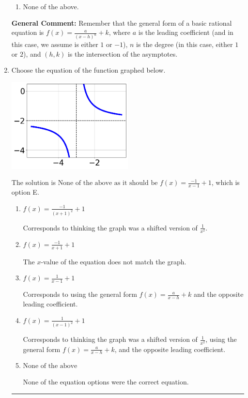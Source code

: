 \documentclass{extbook}[14pt]
\newcommand{\litem}[1]{\item #1

\rule{\textwidth}{0.4pt}}
\begin{document}
\begin{enumerate}
{\begin{enumerate}[label=\Alph*.]
\begin{multicols}{2}
\end{multicols}\item None of the above.\end{enumerate}
\textbf{General Comment:} Remember that the general form of a basic rational equation is $ f(x) = \frac{a}{(x-h)^n} + k$, where $a$ is the leading coefficient (and in this case, we assume is either $1$ or $-1$), $n$ is the degree (in this case, either $1$ or $2$), and $(h, k)$ is the intersection of the asymptotes.
}
\litem{
Choose the equation of the function graphed below.

\begin{center}
    \includegraphics[width=0.5\textwidth]{../Figures/rationalGraphToEquationB.png}
\end{center}



The solution is \( \text{None of the above as it should be } f(x) = \frac{-1}{x - 1} + 1 \), which is option E.\begin{enumerate}[label=\Alph*.]
\item \( f(x) = \frac{-1}{(x + 1)^2} + 1 \)

Corresponds to thinking the graph was a shifted version of $\frac{1}{x^2}$.
\item \( f(x) = \frac{-1}{x + 1} + 1 \)

The $x$-value of the equation does not match the graph.
\item \( f(x) = \frac{1}{x - 1} + 1 \)

Corresponds to using the general form $f(x) = \frac{a}{x-h}+k$ and the opposite leading coefficient.
\item \( f(x) = \frac{1}{(x - 1)^2} + 1 \)

Corresponds to thinking the graph was a shifted version of $\frac{1}{x^2}$, using the general form $f(x) = \frac{a}{x-h}+k$, and the opposite leading coefficient.
\item \( \text{None of the above} \)

None of the equation options were the correct equation.
\end{enumerate}

}
\end{enumerate}
\end{document}
